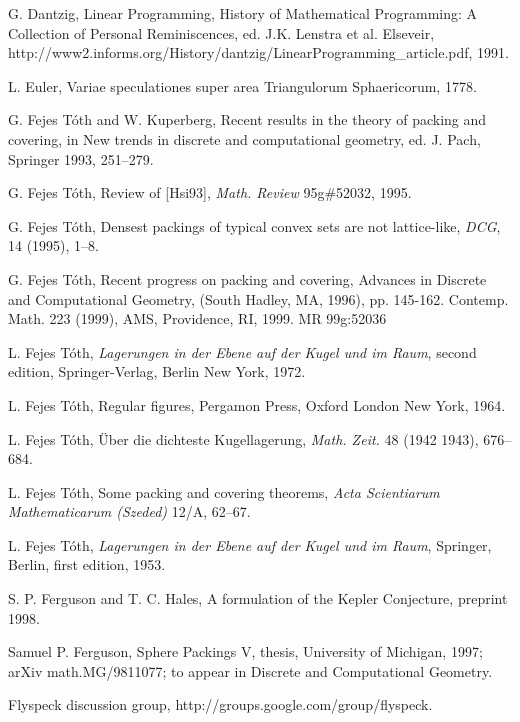 \begin{thebibliography}{CHMS94}
  G. Dantzig, Linear Programming, 
History of Mathematical Programming:
A Collection of Personal Reminiscences, ed. J.K. Lenstra et al.
Elseveir, http://www2.informs.org/History/dantzig/LinearProgramming\_article.pdf, 1991.

 L. Euler, Variae speculationes super area
Triangulorum Sphaericorum, 1778.

 G. Fejes T\'oth and W. Kuperberg, Recent results in the
    theory of packing and covering, in New trends in
    discrete and computational geometry, ed. J. Pach, Springer
    1993, 251--279.

 G. Fejes T\'oth, Review of [Hsi93], {\it Math. Review} 95g\#52032, 1995.

 G. Fejes T\'oth, Densest packings of typical convex sets
    are not lattice-like, {\it DCG}, 14 (1995), 1--8.

 G. Fejes T\'oth, Recent progress on packing and covering,
     Advances
in Discrete and Computational Geometry, (South Hadley, MA, 1996),
pp. 145-162. Contemp. Math. 223 (1999), AMS, Providence, RI, 1999.
MR 99g:52036

 L. Fejes T\'oth, {\it Lagerungen in der Ebene auf der
    Kugel und im Raum}, second edition,
    Springer-Verlag, Berlin New York, 1972.

 L. Fejes T\'oth, Regular figures, Pergamon Press,
    Oxford London New York, 1964.

 L. Fejes T\'oth,  \"Uber die dichteste Kugellagerung,
{\it Math. Zeit.} 48 (1942 1943), 676--684.

 L. Fejes T\'oth, Some packing and covering theorems,
    {\it Acta Scientiarum Mathematicarum (Szeded)} 12/A, 62--67.

 L. Fejes T\'oth, {\it Lagerungen in der Ebene auf
der Kugel und im Raum}, Springer, Berlin, first edition, 1953.

 S. P. Ferguson and T. C. Hales, A formulation of
the Kepler Conjecture, preprint 1998.

 Samuel P. Ferguson, Sphere
Packings V, thesis, University of Michigan,
    1997;  arXiv math.MG/9811077; to appear in Discrete and Computational
    Geometry.

  Flyspeck discussion group,
http://groups.google.com/group/flyspeck.


\end{thebibliography}
